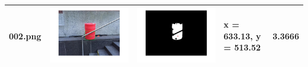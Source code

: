 \documentclass[fleqn,10pt]{SelfArx} %
\begin{document}
\begin{table}
\begin{tabular}{>{\centering\arraybackslash}M{15mm}cc>{\centering\arraybackslash}M{11mm}>{\centering\arraybackslash}M{15mm}}
\hline 
\vspace{-4cm}002.png & \includegraphics[trim={3cm 2cm 3cm 2cm},clip,scale=0.28]{results/002.jpg} & \includegraphics[trim={3cm 2cm 3cm 2cm},clip,scale=0.28]{results/002s.jpg} & \vspace{-4cm} x = 633.13, y = 513.52 & \vspace{-4cm}3.3666 \\ 
\hline 

\end{tabular}
\end{table}
\end{document}
